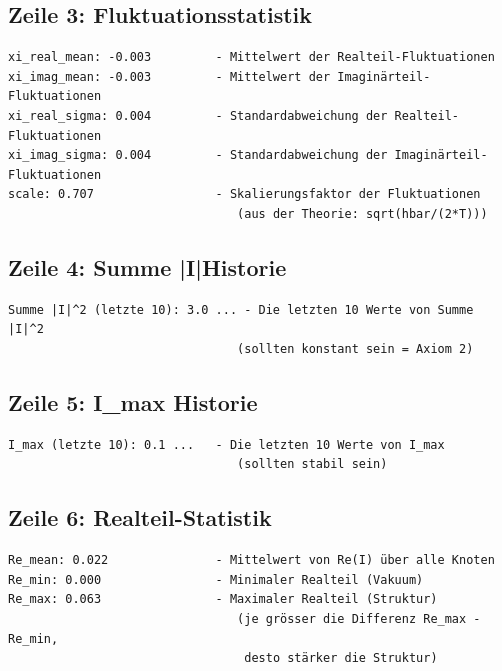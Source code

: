 \subsection{Zeile 3: Fluktuationsstatistik}

\begin{verbatim}
xi_real_mean: -0.003         - Mittelwert der Realteil-Fluktuationen
xi_imag_mean: -0.003         - Mittelwert der Imaginärteil-Fluktuationen
xi_real_sigma: 0.004         - Standardabweichung der Realteil-Fluktuationen
xi_imag_sigma: 0.004         - Standardabweichung der Imaginärteil-Fluktuationen
scale: 0.707                 - Skalierungsfaktor der Fluktuationen
                                (aus der Theorie: sqrt(hbar/(2*T)))
\end{verbatim}

\subsection{Zeile 4: Summe |I|\texttwosuperior Historie}

\begin{verbatim}
Summe |I|^2 (letzte 10): 3.0 ... - Die letzten 10 Werte von Summe |I|^2
                                (sollten konstant sein = Axiom 2)
\end{verbatim}

\subsection{Zeile 5: I\_max Historie}

\begin{verbatim}
I_max (letzte 10): 0.1 ...   - Die letzten 10 Werte von I_max
                                (sollten stabil sein)
\end{verbatim}

\subsection{Zeile 6: Realteil-Statistik}

\begin{verbatim}
Re_mean: 0.022               - Mittelwert von Re(I) über alle Knoten
Re_min: 0.000                - Minimaler Realteil (Vakuum)
Re_max: 0.063                - Maximaler Realteil (Struktur)
                                (je grösser die Differenz Re_max - Re_min,
                                 desto stärker die Struktur)
\end{verbatim}

